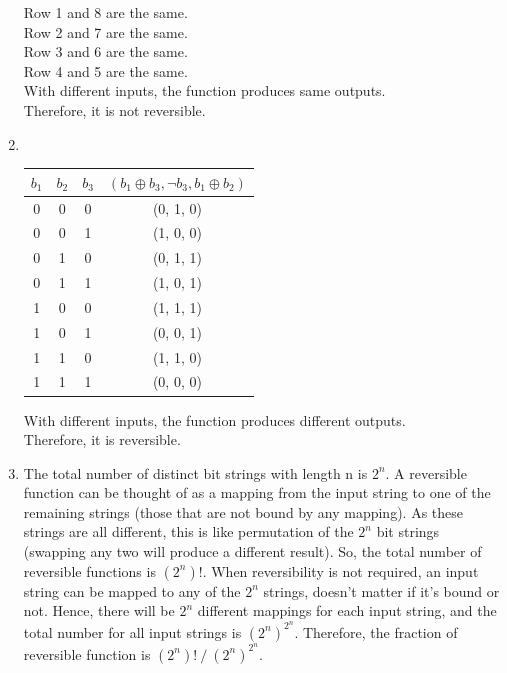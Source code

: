 \documentclass{article}
\begin{document}
\begin{enumerate}
         Row 1 and 8 are the same.\\
         Row 2 and 7 are the same.\\
         Row 3 and 6 are the same.\\
         Row 4 and 5 are the same.\\
         With different inputs, the function produces same outputs.\\
         Therefore, it is not reversible.
     \item
     \hspace{1pt}\\
     \begin{tabular}{|c|c|c|c|}
              \hline
              $b_1$ & $b_2$ & $b_3$ & $(b_1 \oplus b_3, \neg b_3, b_1 \oplus b_2)$ \\
              \hline
              0 & 0 & 0 & (0, 1, 0) \\
              \hline
              0 & 0 & 1 & (1, 0, 0) \\
              \hline
              0 & 1 & 0 & (0, 1, 1) \\
              \hline
              0 & 1 & 1 & (1, 0, 1) \\
              \hline
              1 & 0 & 0 & (1, 1, 1) \\
              \hline
              1 & 0 & 1 & (0, 0, 1) \\
              \hline
              1 & 1 & 0 & (1, 1, 0) \\
              \hline
              1 & 1 & 1 & (0, 0, 0) \\
              \hline
         \end{tabular}
         
         With different inputs, the function produces different outputs.\\Therefore, it is reversible.
     \item
     The total number of distinct bit strings with length n is $2^n$. A reversible function can be thought of as a mapping from the input string to one of the remaining strings (those that are not bound by any mapping). As these strings are all different, this is like permutation of the $2^n$ bit strings (swapping any two will produce a different result). So, the total number of reversible functions is $(2^n)!$. When reversibility is not required, an input string can be mapped to any of the $2^n$ strings, doesn't matter if it's bound or not. Hence, there will be $2^n$ different mappings for each input string, and the total number for all input strings is $(2^n)^{2^n}$. Therefore, the fraction of reversible function is ${(2^n)!}\ /\ {(2^n)^{2^n}}$.
 \end{enumerate}
\end{document}
